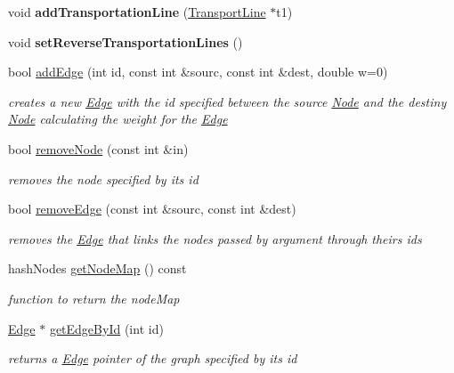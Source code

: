 \begin{DoxyCompactItemize}
\mbox{\label{class_graph_ad91ffd436c73c1864b4f89689a765cab}} 
void {\bfseries add\+Transportation\+Line} (\hyperlink{class_transport_line}{Transport\+Line} $\ast$t1)
\item 
\mbox{\label{class_graph_ac562fcd5bd174ccd827d80fdc9ccba60}} 
void {\bfseries set\+Reverse\+Transportation\+Lines} ()
\item 
bool \hyperlink{class_graph_a0941096cc5dc9217a412354881027f56}{add\+Edge} (int id, const int \&sourc, const int \&dest, double w=0)
\begin{DoxyCompactList}\small\item\em creates a new \hyperlink{class_edge}{Edge} with the id specified between the source \hyperlink{class_node}{Node} and the destiny \hyperlink{class_node}{Node} calculating the weight for the \hyperlink{class_edge}{Edge} \end{DoxyCompactList}\item 
bool \hyperlink{class_graph_a93055dfe99fb1bb404035db6b47a3041}{remove\+Node} (const int \&in)
\begin{DoxyCompactList}\small\item\em removes the node specified by its id \end{DoxyCompactList}\item 
bool \hyperlink{class_graph_a7a5c1d9d236c0adb8bb3a97dfde7e0bb}{remove\+Edge} (const int \&sourc, const int \&dest)
\begin{DoxyCompactList}\small\item\em removes the \hyperlink{class_edge}{Edge} that links the nodes passed by argument through theirs id\textquotesingle{}s \end{DoxyCompactList}\item 
hash\+Nodes \hyperlink{class_graph_ad0e4a55a991de20c7d1ad31210cfc575}{get\+Node\+Map} () const
\begin{DoxyCompactList}\small\item\em function to return the node\+Map \end{DoxyCompactList}\item 
\hyperlink{class_edge}{Edge} $\ast$ \hyperlink{class_graph_a24ab353dedffc675eda551aabb6e2ed1}{get\+Edge\+By\+Id} (int id)
\begin{DoxyCompactList}\small\item\em returns a \hyperlink{class_edge}{Edge} pointer of the graph specified by its id \end{DoxyCompactList}\item 

\end{DoxyCompactItemize}
